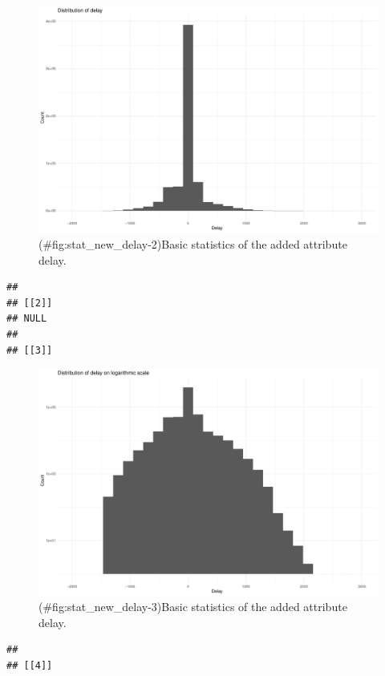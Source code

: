 \documentclass[
]{article}
\begin{document}
\begin{figure}
\centering
\includegraphics{Documentation_Rmarkdown_files/figure-latex/stat_new_delay-2.pdf}
\caption{(\#fig:stat\_new\_delay-2)\label{fig:stat_new_delay}Basic statistics of the added attribute delay.}
\end{figure}

\begin{verbatim}
## 
## [[2]]
## NULL
## 
## [[3]]
\end{verbatim}

\begin{figure}
\centering
\includegraphics{Documentation_Rmarkdown_files/figure-latex/stat_new_delay-3.pdf}
\caption{(\#fig:stat\_new\_delay-3)\label{fig:stat_new_delay}Basic statistics of the added attribute delay.}
\end{figure}

\begin{verbatim}
## 
## [[4]]
\end{verbatim}
\end{document}

